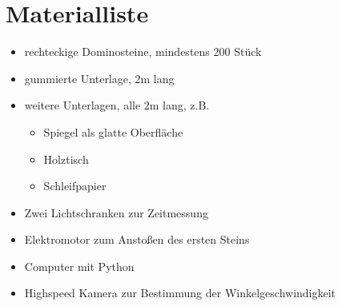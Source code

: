 \section{Materialliste}
\begin{itemize}
    \item rechteckige Dominosteine, mindestens 200 Stück
    \item gummierte Unterlage, 2m lang
    \item weitere Unterlagen, alle 2m lang, z.B.
    \begin{itemize}
        \item Spiegel als glatte Oberfläche
        \item Holztisch
        \item Schleifpapier
    \end{itemize}
    \item Zwei Lichtschranken zur Zeitmessung
    \item Elektromotor zum Anstoßen des ersten Steins
    \item Computer mit Python
    \item Highspeed Kamera zur Bestimmung der Winkelgeschwindigkeit \\
\end{itemize}
